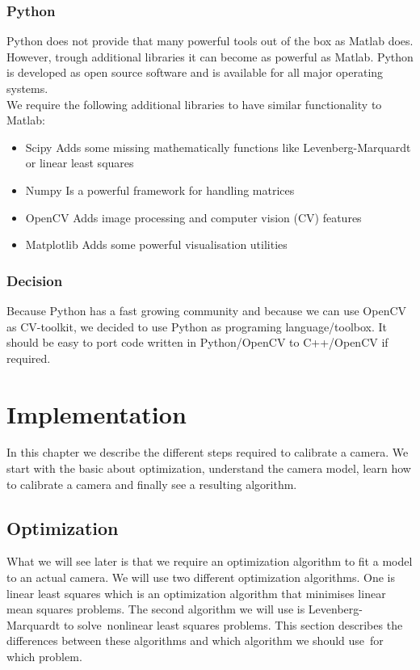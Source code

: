 \documentclass[11pt,a4paper,titlepage,oneside]{report}
\begin{document}
\subsection{Python}
Python does not provide that many powerful tools out of the box as Matlab does. However, trough additional libraries it can become as powerful as Matlab. Python is developed as open source software and is available for all major operating systems.\\
We require the following additional libraries to have similar functionality to Matlab:
\begin{itemize}
  \item Scipy
    \subitem Adds some missing mathematically functions like Levenberg-Marquardt or linear least squares
  \item Numpy
    \subitem Is a powerful framework for handling matrices
  \item OpenCV
		\subitem Adds image processing and computer vision (CV) features
  \item Matplotlib
    \subitem Adds some powerful visualisation utilities
\end{itemize}

\subsection{Decision}
Because Python has a fast growing community and because we can use OpenCV as CV-toolkit, we decided to use Python as programing language/toolbox. It should be easy to port code written in Python/OpenCV to C++/OpenCV if required.

\chapter{Implementation}\label{chap:implementation}

In this chapter we describe the different steps required to calibrate a camera. We start with the basic about optimization, understand the camera model, learn how to calibrate a camera and finally see a resulting algorithm.

\section{Optimization}
What we will see later is that we require an optimization algorithm to fit a model to an actual camera. We will use two different optimization algorithms. One is linear least squares which is an optimization algorithm that minimises linear mean squares problems. The second algorithm we will use is Levenberg-Marquardt to solve nonlinear least squares problems. This section describes the differences between these algorithms and which algorithm we should use for which problem.
\end{document}

